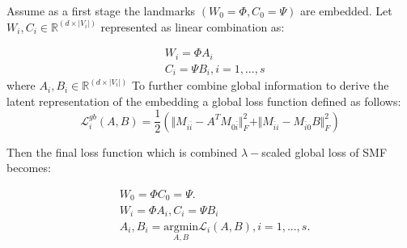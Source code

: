 \begin{itemize}
Assume as a first stage  the landmarks $(W_0 = \Phi, C_0 = \Psi)$ are embedded. Let $W_i, C_i \in \mathbb{R}^{(d\times|V_i|)}$ represented as linear combination as:

\begin{align*}
& W_i= \Phi A_i \\
& C_i= \Psi B_i, i=1,..., s
\end{align*}
where $A_i, B_i \in \mathbb{R}^{(d\times|V_i|)}$
To further combine global information to derive the latent representation of the embedding a global loss function defined as follows:
\begin{equation}
\mathcal{L}_{i}^{gb}(A,B)=\frac{1}{2}(\Vert M_{i\bar{i}} - A^T M_{0\bar{i}}\Vert_{F}^2 +\Vert M_{\bar{i}i} - M_{\bar{i}0}B\Vert_{F}^2)
\end{equation} 

Then the final loss function which is combined $\lambda-$scaled global loss of SMF becomes:

\begin{align*}
& W_0= \Phi C_0= \Psi . \\
& W_i= \Phi A_i, C_i= \Psi B_i \\
& A_i,B_i=\underset{A,B}{\mathrm{argmin}}\mathcal{L}_{i}(A,B),  i=1,..., s. 
\end{align*}




\end{itemize}


